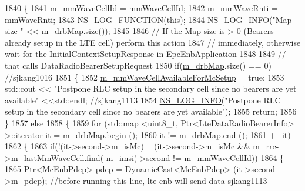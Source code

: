 \begin{DoxyCode}
1840 \{
1841   \hyperlink{classns3_1_1UeManager_a0f53cb816bd8a3ad6227dc9adca671b2}{m\_mmWaveCellId} = mmWaveCellId;
1842   \hyperlink{classns3_1_1UeManager_a3d5cf7dc8a13b9e2616ecb9a70faebd3}{m\_mmWaveRnti} = mmWaveRnti;
1843   \hyperlink{log-macros-disabled_8h_a90b90d5bad1f39cb1b64923ea94c0761}{NS\_LOG\_FUNCTION}(\textcolor{keyword}{this});
1844   \hyperlink{group__logging_gafbd73ee2cf9f26b319f49086d8e860fb}{NS\_LOG\_INFO}(\textcolor{stringliteral}{"Map size "} << \hyperlink{classns3_1_1UeManager_a18499c025730b63c73e5d93effff57aa}{m\_drbMap}.size());
1845 
1846   \textcolor{comment}{// If the Map size is > 0 (Bearers already setup in the LTE cell) perform this action}
1847   \textcolor{comment}{// immediately, otherwise wait for the InitialContextSetupResponse in EpcEnbApplication}
1848 
1849   \textcolor{comment}{// that calls DataRadioBearerSetupRequest}
1850   \textcolor{keywordflow}{if}(\hyperlink{classns3_1_1UeManager_a18499c025730b63c73e5d93effff57aa}{m\_drbMap}.size() == 0)  \textcolor{comment}{//sjkang1016}
1851   \{
1852     \hyperlink{classns3_1_1UeManager_ad0ab1d98110575774a2d4da876878ad2}{m\_mmWaveCellAvailableForMcSetup} = \textcolor{keyword}{true};
1853     std::cout << \textcolor{stringliteral}{"Postpone RLC setup in the secondary cell since no bearers are yet available"} <<std::endl;
       \textcolor{comment}{//sjkang1113}
1854     \hyperlink{group__logging_gafbd73ee2cf9f26b319f49086d8e860fb}{NS\_LOG\_INFO}(\textcolor{stringliteral}{"Postpone RLC setup in the secondary cell since no bearers are yet available"});
1855     \textcolor{keywordflow}{return};
1856   \}
1857   \textcolor{keywordflow}{else}
1858   \{
1859     \textcolor{keywordflow}{for} (std::map <uint8\_t, Ptr<LteDataRadioBearerInfo> >::iterator it = 
      \hyperlink{classns3_1_1UeManager_a18499c025730b63c73e5d93effff57aa}{m\_drbMap}.begin ();
1860        it != \hyperlink{classns3_1_1UeManager_a18499c025730b63c73e5d93effff57aa}{m\_drbMap}.end ();
1861        ++it)
1862     \{
1863       \textcolor{keywordflow}{if}(!(it->second->m\_isMc) || (it->second->m\_isMc && \hyperlink{classns3_1_1UeManager_ab4405e9f354c66e7c1a4c95832290f5b}{m\_rrc}->m\_lastMmWaveCell.find(
      \hyperlink{classns3_1_1UeManager_a868dda076ecfc1d4202e357c16223d84}{m\_imsi})->second != \hyperlink{classns3_1_1UeManager_a0f53cb816bd8a3ad6227dc9adca671b2}{m\_mmWaveCellId}))
1864       \{
1865           Ptr<McEnbPdcp> pdcp = DynamicCast<McEnbPdcp> (it->second->m\_pdcp); \textcolor{comment}{//before running this line,
       lte enb will send data sjkang1113}

\end{DoxyCode}
